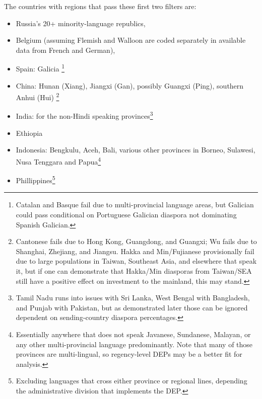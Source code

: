\documentclass[12pt]{article}
\begin{document}
    The countries with regions that pass these first two filters are:
\begin{itemize}
    \item Russia's 20+ minority-language republics,
    \item Belgium (assuming Flemish and Walloon are coded separately in available data from French and German),
    \item Spain: Galicia \footnote{Catalan and Basque fail due to multi-provincial language areas, but Galician could pass conditional on Portuguese Galician diaspora not dominating Spanish Galician.}
    \item China: Hunan (Xiang), Jiangxi (Gan), possibly Guangxi (Ping), southern Anhui (Hui) \footnote{Cantonese fails due to Hong Kong, Guangdong, and Guangxi; Wu fails due to Shanghai, Zhejiang, and Jiangsu. Hakka and Min/Fujianese provisionally fail due to large populations in Taiwan, Southeast Asia, and elsewhere that speak it, but if one can demonstrate that Hakka/Min diasporas from Taiwan/SEA still have a positive effect on investment to the mainland, this may stand.}
    \item India: for the non-Hindi speaking provinces\footnote{Tamil Nadu runs into issues with Sri Lanka, West Bengal with Bangladesh, and Punjab with Pakistan, but as demonstrated later those can be ignored dependent on sending-country diaspora percentages.} 
    \item Ethiopia
    \item Indonesia: Bengkulu, Aceh, Bali, various other provinces in Borneo, Sulawesi, Nusa Tenggara and Papua\footnote{Essentially anywhere that does not speak Javanese, Sundanese, Malayan, or any other multi-provincial language predominantly. Note that many of those provinces are multi-lingual, so regency-level DEPs may be a better fit for analysis.}
    \item Phillippines\footnote{Excluding languages that cross either province or regional lines, depending the administrative division that implements the DEP.}
\end{itemize}
\end{document}
